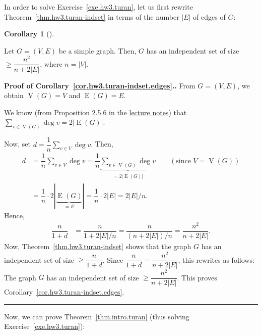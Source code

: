 \documentclass[numbers=enddot,12pt,final,onecolumn,notitlepage]{scrartcl}%
\theoremstyle{definition}
\newtheorem{coro}[theo]{Corollary}
\newenvironment{corollary}[1][]
{\begin{coro}[#1]\begin{leftbar}}
{\end{leftbar}\end{coro}}
\newenvironment{proof}[1][Proof]{\noindent\textbf{#1.} }{\ \rule{0.5em}{0.5em}}
\let\sumnonlimits\sum
\renewcommand{\sum}{\sumnonlimits\limits}
\newcommand{\abs}[1]{\left| #1 \right|}
\newcommand{\tup}[1]{\left( #1 \right)}
\newcommand{\verts}[1]{\operatorname{V}\left( #1 \right)}
\newcommand{\edges}[1]{\operatorname{E}\left( #1 \right)}
\newcommand{\underbrack}[2]{\underbrace{#1}_{\substack{#2}}}
\begin{document}
In order to solve Exercise~\ref{exe.hw3.turan}, let us first rewrite
Theorem~\ref{thm.hw3.turan-indset} in terms of the number $\abs{E}$ of
edges of $G$:

\begin{corollary} \label{cor.hw3.turan-indset.edges}
Let $G = \tup{V, E}$ be a simple graph.
Then, $G$ has an independent set of size
$\geq \dfrac{n^2}{n+2\abs{E}}$, where $n = \abs{V}$.
\end{corollary}

\begin{proof}[Proof of Corollary~\ref{cor.hw3.turan-indset.edges}.]
From $G = \tup{V, E}$, we obtain $\verts{G} = V$ and $\edges{G} = E$.

We know (from
Proposition 2.5.6 in the
\href{http://www-users.math.umn.edu/~dgrinber/5707s17/nogra.pdf}{lecture notes})
that $\sum_{v \in \verts{G}} \deg v = 2 \abs{\edges{G}}$.

Now, set $d = \dfrac{1}{n} \sum_{v \in V} \deg v$.
Then,
\begin{align*}
d
&= \dfrac{1}{n} \sum_{v \in V} \deg v
= \dfrac{1}{n} \underbrack{\sum_{v \in \verts{G}} \deg v}
                          {= 2 \abs{\edges{G}}}
\qquad \left(\text{since } V = \verts{G}\right) \\
&= \dfrac{1}{n} \cdot 2 \abs{\underbrace{\edges{G}}_{= E}}
= \dfrac{1}{n} \cdot 2 \abs{E} = 2 \abs{E} / n .
\end{align*}
Hence,
\begin{align*}
\dfrac{n}{1+d}
&= \dfrac{n}{1 + 2 \abs{E} / n}
= \dfrac{n}{\tup{n + 2 \abs{E}} / n}
= \dfrac{n^2}{n+2\abs{E}}.
\end{align*}
Now, Theorem~\ref{thm.hw3.turan-indset} shows that the graph
$G$ has an independent set of size $\geq \dfrac{n}{1+d}$.
Since $\dfrac{n}{1+d} = \dfrac{n^2}{n+2\abs{E}}$, this rewrites as
follows:
The graph $G$ has an independent set of size
$\geq \dfrac{n^2}{n+2\abs{E}}$.
This proves Corollary~\ref{cor.hw3.turan-indset.edges}.
\end{proof}

Now, we can prove Theorem~\ref{thm.intro.turan} (thus solving
Exercise~\ref{exe.hw3.turan}):
\end{document}
